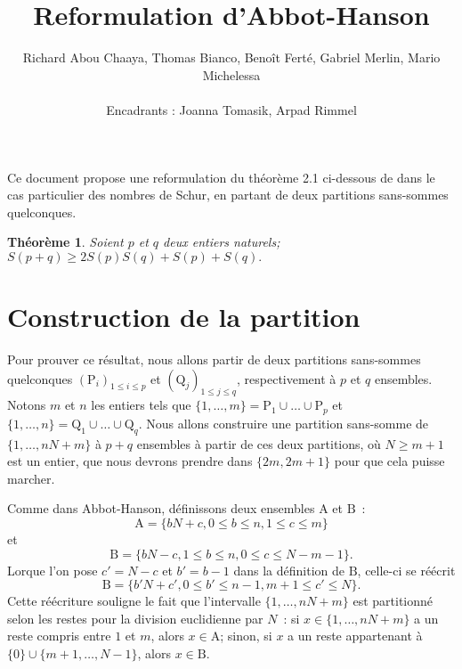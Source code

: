 \documentclass[11pt, oneside]{article}
\title{Reformulation d'Abbot-Hanson}
\author{Richard Abou Chaaya, Thomas Bianco, Benoît Ferté, Gabriel Merlin, Mario Michelessa \\ \\
Encadrants : Joanna Tomasik, Arpad Rimmel}
\date{}
\newtheorem{theoreme}{Théorème}
\begin{document}
\maketitle

Ce document propose une reformulation du théorème 2.1 ci-dessous de \cite{AbbotHanson} dans le cas particulier des nombres de Schur,
en partant de deux partitions sans-sommes quelconques.

\begin{theoreme}
Soient $p$ et $q$ deux entiers naturels; $S(p + q) \geqslant 2 S(p) S(q) + S(p) + S(q).$
\end{theoreme}

\section{Construction de la partition}

Pour prouver ce résultat, nous allons partir de deux partitions sans-sommes quelconques $(\mathrm{P}_i)_{1 \leqslant i \leqslant p}$
et $(\mathrm{Q}_j)_{1 \leqslant j \leqslant q}$, respectivement à $p$ et $q$ ensembles.
Notons $m$ et $n$ les entiers tels que $\{1, \dots, m\} = \mathrm{P}_1 \cup \dots \cup \mathrm{P}_p$
et $\{1, \dots, n\} = \mathrm{Q}_1 \cup \dots \cup \mathrm{Q}_q$.
Nous allons construire une partition sans-somme de $\{1, \dots, nN + m\}$ à $p+q$ ensembles à partir de ces deux partitions,
où $N \geqslant m + 1$ est un entier, que nous devrons prendre dans $\{2m, 2m+1\}$ pour que cela puisse marcher.

Comme dans Abbot-Hanson, définissons deux ensembles $\mathrm{A}$ et $\mathrm{B}$~:
\begin{equation}
 \mathrm{A} = \{ bN + c, 0 \leqslant b \leqslant n, 1 \leqslant c \leqslant m \}
\end{equation}
et
\begin{equation}
 \mathrm{B} = \{ bN - c, 1 \leqslant b \leqslant n, 0 \leqslant c \leqslant N-m-1 \}.
\end{equation}
Lorque l'on pose $c' = N - c$ et $b' = b-1$ dans la définition de $\mathrm{B}$, celle-ci se réécrit
\[ \mathrm{B} = \{ b'N + c', 0 \leqslant b' \leqslant n-1, m+1 \leqslant c' \leqslant N \}. \]
Cette réécriture souligne le fait que l'intervalle $\{1, \dots, nN + m \}$ est partitionné selon les restes pour la division euclidienne par $N$~:
si $x \in \{1, \dots, nN + m \}$ a un reste compris entre $1$ et $m$, alors $x \in \mathrm{A}$;
sinon, si $x$ a un reste appartenant à $\{0\} \cup \{m+1, \dots, N-1\}$, alors $x \in \mathrm{B}$.
\end{document}
